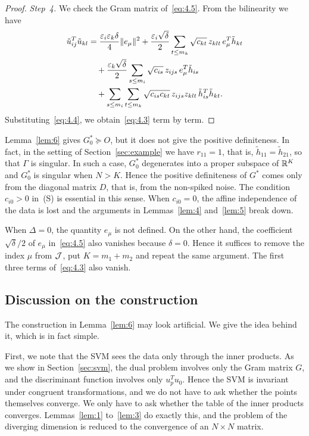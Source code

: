 \begin{proof}
\textit{Step~4.} We check the Gram matrix of~\eqref{eq:4.5}. From the bilinearity
we have
\begin{align*}
\tilde u_{ij}^T\tilde u_{kl}
&=\frac{\varepsilon_i\varepsilon_k\delta}{4}\|e_\mu\|^2
+\frac{\varepsilon_i\sqrt{\delta}}{2}\sum_{t\le m_k}\sqrt{c_{kt}}\,z_{klt}\,e_\mu^T\tilde h_{kt}\\
&\quad+\frac{\varepsilon_k\sqrt{\delta}}{2}\sum_{s\le m_i}\sqrt{c_{is}}\,z_{ijs}\,e_\mu^T\tilde h_{is}\\
&\quad+\sum_{s\le m_i}\sum_{t\le m_k}\sqrt{c_{is}c_{kt}}\,z_{ijs}z_{klt}\,
\tilde h_{is}^T\tilde h_{kt}.
\end{align*}
Substituting~\eqref{eq:4.4}, we obtain~\eqref{eq:4.3} term by term.
\end{proof}

\begin{remark}
\label{rem:2}
Lemma~\ref{lem:6} gives $G_0^*\succeq O$, but it does not give the positive
definiteness. In fact, in the setting of Section~\ref{sec:example} we have
$r_{11}=1$, that is, $\tilde h_{11}=\tilde h_{21}$, so that $\Gamma$ is singular.
In such a case, $G_0^*$ degenerates into a proper subspace of $\mathbb{R}^K$ and $G_0^*$ is
singular when $N>K$. Hence the positive definiteness of $G^*$ comes only from the
diagonal matrix $D$, that is, from the non-spiked noise. The condition $c_{i0}>0$
in~(S) is essential in this sense. When $c_{i0}=0$, the affine independence of the
data is lost and the arguments in Lemmas~\ref{lem:4} and~\ref{lem:5} break down.
\end{remark}

\begin{remark}
\label{rem:3}
When $\Delta=0$, the quantity $e_\mu$ is not defined. On the other hand, the
coefficient $\sqrt{\delta}/2$ of $e_\mu$ in~\eqref{eq:4.5} also vanishes because
$\delta=0$. Hence it suffices to remove the index $\mu$ from $\mathcal{J}$, put
$K=m_1+m_2$ and repeat the same argument. The first three terms of~\eqref{eq:4.3}
also vanish.
\end{remark}

\subsection{Discussion on the construction}

The construction in Lemma~\ref{lem:6} may look artificial. We give the idea behind
it, which is in fact simple.

First, we note that the SVM sees the data only through the inner products. As we
show in Section~\ref{sec:svm}, the dual problem involves only the Gram matrix $G$,
and the discriminant function involves only $u_p^Tu_0$. Hence the SVM is invariant
under congruent transformations, and we do not have to ask whether the points
themselves converge. We only have to ask whether the table of the inner products
converges. Lemmas~\ref{lem:1} to~\ref{lem:3} do exactly this, and the problem of
the diverging dimension is reduced to the convergence of an $N\times N$ matrix.

